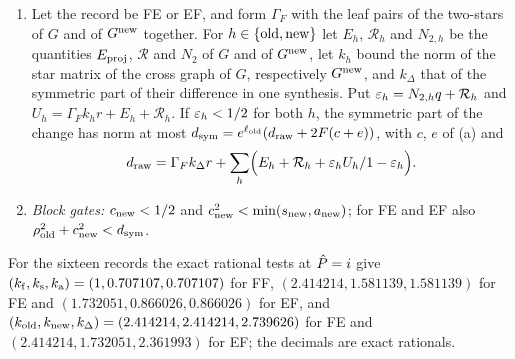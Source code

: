 \begin{proposition}
\begin{enumerate}[label=(\alph*)]
\item Let the record be FE or EF, and form $\Gamma_F$ with the leaf pairs of the
 two-stars of $G$ and of $G^{\rm new}$ together. For $h\in\{{\rm old},{\rm new}\}$
 let $E_h$, $\mathcal R_h$ and $N_{2,h}$ be the quantities $E_{\rm proj}$,
 $\mathcal R$ and $N_2$ of $G$ and of $G^{\rm new}$, let $k_h$ bound the norm of
 the star matrix of the cross graph of $G$, respectively $G^{\rm new}$, and
 $k_\Delta$ that of the symmetric part of their difference in one synthesis. Put
 $\eps_h=N_{2,h}q+\mathcal R_h$ and $U_h=\Gamma_Fk_hr+E_h+\mathcal R_h$. If
 $\eps_h<\frac12$ for both $h$, the symmetric part of the change has norm at most
 $d_{\rm sym}=e^{\ell_{\rm old}}(d_{\rm raw}+2F(c+e))$, with $c$, $e$ of (a) and
 \[
  d_{\rm raw}=\Gamma_Fk_\Delta r+\sum_h\Bigl(E_h+\mathcal R_h+\frac{\eps_hU_h}{1-\eps_h}\Bigr).
 \]
\item \emph{Block gates:} $c_{\rm new}<\frac12$ and
 $c_{\rm new}^2<\min(s_{\rm new},a_{\rm new})$; for FE and EF also
 $\rho_{\rm old}^2+c_{\rm new}^2<d_{\rm sym}$.
\end{enumerate}
For the sixteen records the exact rational tests at $\Phat=i$ give
$(k_{\rm f},k_{\rm s},k_{\rm a})=(1,0.707107,0.707107)$ for FF,
$(2.414214,1.581139,1.581139)$ for FE and $(1.732051,0.866026,0.866026)$ for EF,
and $(k_{\rm old},k_{\rm new},k_\Delta)=(2.414214,2.414214,2.739626)$ for FE and
$(2.414214,1.732051,2.361993)$ for EF; the decimals are exact rationals.
\end{proposition}

